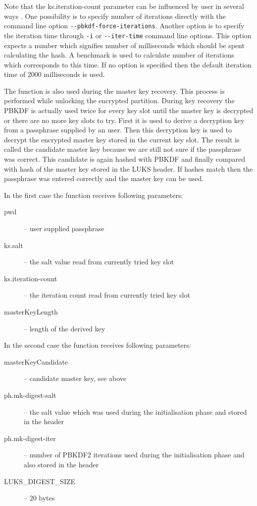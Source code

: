 \documentclass[nolof]{fithesis3}
\begin{document}
Note that the ks.iteration-count parameter can be influenced by user in several ways \parencite{cryptsetupmanual}. One possibility is to specify number of iterations directly with the command line option \verb+--pbkdf-force-iterations+. Another option is to specify the iteration time through \verb+-i+ or \verb+--iter-time+ command line options. This option expects a number which signifies number of milliseconds which should be spent calculating the hash. A benchmark is used to calculate number of iterations which corresponds to this time. If no option is specified then the default iteration time of 2000 milliseconds is used.

The function is also used during the master key recovery. This process is performed while unlocking the encrypted partition. During key recovery the PBKDF is actually used twice for every key slot until the master key is decrypted or there are no more key slots to try. First it is used to derive a decryption key from a passphrase supplied by an user. Then this decryption key is used to decrypt the encrypted master key stored in the current key slot. The result is called the candidate master key because we are still not sure if the passphrase was correct. This candidate is again hashed with PBKDF and finally compared with hash of the master key stored in the LUKS header. If hashes match then the passphrase was entered correctly and the master key can be used.

In the first case the function receives following parameters:

\begin{description}
\item[pwd] -- user supplied passphrase

\item[ks.salt] -- the salt value read from currently tried key slot

\item[ks.iteration-count] -- the iteration count read from currently tried key slot

\item[masterKeyLength] -- length of the derived key
\end{description}

In the second case the function receives following parameters:

\begin{description}
\item[masterKeyCandidate] -- candidate master key, see above

\item[ph.mk-digest-salt] -- the salt value which was used during the initialisation phase and stored in the header

\item[ph.mk-digest-iter] -- number of PBKDF2 iterations used during the initialisation phase and also stored in the header

\item[LUKS\_DIGEST\_SIZE] -- 20 bytes
\end{description}
\end{document}
